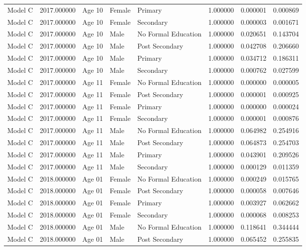 \begin{table}[ht]
\begin{tabular}{lrlllrrr}
Model C & 2017.000000 & Age 10 & Female & Primary & 1.000000 & 0.000001 & 0.000869 \\
Model C & 2017.000000 & Age 10 & Female & Secondary & 1.000000 & 0.000003 & 0.001671 \\
Model C & 2017.000000 & Age 10 & Male & No Formal Education & 1.000000 & 0.020651 & 0.143704 \\
Model C & 2017.000000 & Age 10 & Male & Post Secondary & 1.000000 & 0.042708 & 0.206660 \\
Model C & 2017.000000 & Age 10 & Male & Primary & 1.000000 & 0.034712 & 0.186311 \\
Model C & 2017.000000 & Age 10 & Male & Secondary & 1.000000 & 0.000762 & 0.027599 \\
Model C & 2017.000000 & Age 11 & Female & No Formal Education & 1.000000 & 0.000000 & 0.000005 \\
Model C & 2017.000000 & Age 11 & Female & Post Secondary & 1.000000 & 0.000001 & 0.000925 \\
Model C & 2017.000000 & Age 11 & Female & Primary & 1.000000 & 0.000000 & 0.000024 \\
Model C & 2017.000000 & Age 11 & Female & Secondary & 1.000000 & 0.000001 & 0.000876 \\
Model C & 2017.000000 & Age 11 & Male & No Formal Education & 1.000000 & 0.064982 & 0.254916 \\
Model C & 2017.000000 & Age 11 & Male & Post Secondary & 1.000000 & 0.064873 & 0.254703 \\
Model C & 2017.000000 & Age 11 & Male & Primary & 1.000000 & 0.043901 & 0.209526 \\
Model C & 2017.000000 & Age 11 & Male & Secondary & 1.000000 & 0.000129 & 0.011359 \\
Model C & 2018.000000 & Age 01 & Female & No Formal Education & 1.000000 & 0.000249 & 0.015765 \\
Model C & 2018.000000 & Age 01 & Female & Post Secondary & 1.000000 & 0.000058 & 0.007646 \\
Model C & 2018.000000 & Age 01 & Female & Primary & 1.000000 & 0.003927 & 0.062662 \\
Model C & 2018.000000 & Age 01 & Female & Secondary & 1.000000 & 0.000068 & 0.008253 \\
Model C & 2018.000000 & Age 01 & Male & No Formal Education & 1.000000 & 0.118641 & 0.344444 \\
Model C & 2018.000000 & Age 01 & Male & Post Secondary & 1.000000 & 0.065452 & 0.255835 \\

\end{tabular}
\end{table}

